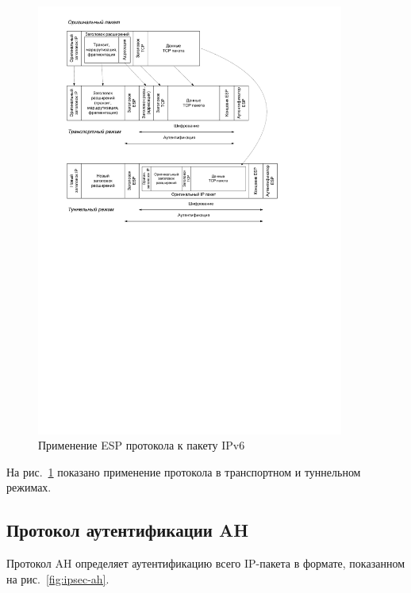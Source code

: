 \begin{figure}[!ht]
	\centering
	\includegraphics[width=0.9\textwidth]{pic/ipsec-esp-modes}
	\caption{Применение ESP протокола к пакету IPv6\label{fig:ipsec-esp-modes}}
\end{figure}

На рис.~\ref{fig:ipsec-esp-modes} показано применение протокола в транспортном и туннельном режимах.


\subsection{Протокол аутентификации AH}

Протокол AH определяет аутентификацию всего IP-пакета в формате, показанном на рис.~\ref{fig:ipsec-ah}.

